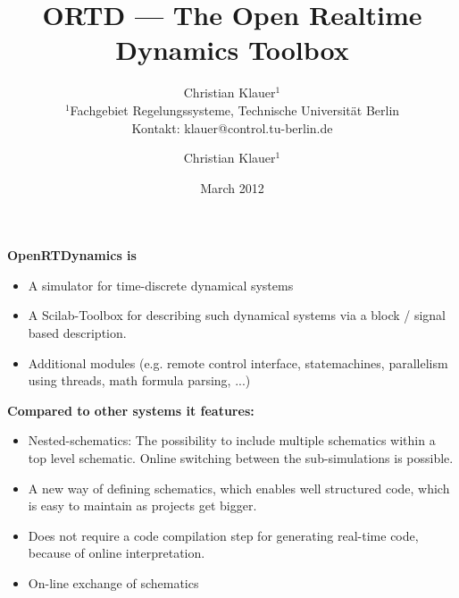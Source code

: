 \documentclass[serif,9pt,xcolor=dvipsnames]{beamer}
\title[]{ORTD --- The Open Realtime Dynamics Toolbox}
\subtitle{} %
\date{March 2012}
\author{Christian Klauer$^{1}$\\
{\tiny $^{1}$Fachgebiet Regelungssysteme, Technische Universität Berlin\\
Kontakt: klauer@control.tu-berlin.de}
}
\begin{document}

\author{Christian Klauer$^{1}$}



\begin{frame}
  \maketitle
\end{frame}


\begin{frame}

\textbf{OpenRTDynamics is}

 \begin{itemize}
  \item A simulator for time-discrete dynamical systems
  \item A Scilab-Toolbox for describing such dynamical systems via a block / signal based description.
  \item Additional modules (e.g. remote control interface, statemachines, parallelism using threads, math formula parsing, ...)
 \end{itemize}

\textbf{Compared to other systems it features:}
\begin{itemize}
 \item Nested-schematics: The possibility to include multiple schematics within a top level schematic. Online switching between the sub-simulations is possible.
 \item A new way of defining schematics, which enables well structured code, which is easy to maintain as projects get bigger.
\item Does not require a code compilation step for generating real-time code, because of online interpretation.
\item On-line exchange of schematics
\end{itemize}


\end{frame}
\end{document}
